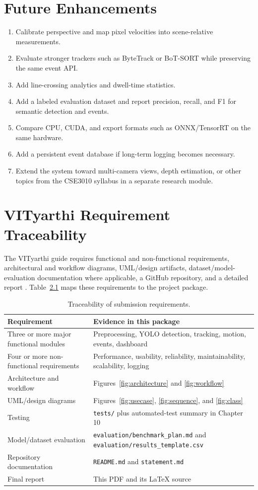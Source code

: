 \documentclass[12pt,a4paper]{report}
\newcommand{\code}[1]{\texttt{#1}}
\begin{document}
\chapter{Future Enhancements}
\begin{enumerate}[leftmargin=*]
  \item Calibrate perspective and map pixel velocities into scene-relative measurements.
  \item Evaluate stronger trackers such as ByteTrack or BoT-SORT while preserving the same event API.
  \item Add line-crossing analytics and dwell-time statistics.
  \item Add a labeled evaluation dataset and report precision, recall, and F1 for semantic detection and events.
  \item Compare CPU, CUDA, and export formats such as ONNX/TensorRT on the same hardware.
  \item Add a persistent event database if long-term logging becomes necessary.
  \item Extend the system toward multi-camera views, depth estimation, or other topics from the CSE3010 syllabus in a separate research module.
\end{enumerate}

\chapter{VITyarthi Requirement Traceability}
The VITyarthi guide requires functional and non-functional requirements, architectural and workflow diagrams, UML/design artifacts, dataset/model-evaluation documentation where applicable, a GitHub repository, and a detailed report \cite{vityarthi_guide}. Table~\ref{tab:traceability} maps these requirements to the project package.

\begin{longtable}{p{}p{}}
\caption{Traceability of submission requirements.}\label{tab:traceability}\\
\toprule
Requirement & Evidence in this package\\
\midrule
Three or more major functional modules & Preprocessing, YOLO detection, tracking, motion, events, dashboard\\
Four or more non-functional requirements & Performance, usability, reliability, maintainability, scalability, logging\\
Architecture and workflow & Figures~\ref{fig:architecture} and \ref{fig:workflow}\\
UML/design diagrams & Figures~\ref{fig:usecase}, \ref{fig:sequence}, and \ref{fig:class}\\
Testing & \code{tests/} plus automated-test summary in Chapter 10\\
Model/dataset evaluation & \code{evaluation/benchmark\_plan.md} and \code{evaluation/results\_template.csv}\\
Repository documentation & \code{README.md} and \code{statement.md}\\
Final report & This PDF and its LaTeX source\\
\bottomrule
\end{longtable}
\end{document}
